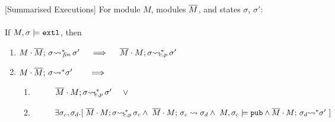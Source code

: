 \begin{auxLemma}
\label{lemma:external_breakdown:term}[Summarised Executions]
For   module $M$, modules $\overline{M}$, and states $\sigma$, $\sigma'$:
\\
\\
If $M,\sigma \models \mbox{\normalfont{\texttt{extl}}}$, then
\begin{enumerate}
\item
\label{lemma:external_breakdown:term:one}
$\leadstoBoundedStarFin {M\cdot \Mtwo}  {\sigma}  {\sigma'}  \ \ \  \ 
\Longrightarrow \ \ \  \ \leadstoBoundedExtPub {\Mtwo\cdot M}    {\sigma}  {\sigma'}$
\item
\label{lemma:external_breakdown:two}
$M\cdot \overline{M};\, {\sigma} {\rightsquigarrow^*} \sigma'  \ \ \  \ \ \  
\Longrightarrow$ 

\begin{enumerate}
\item
$\strut \ \ \ \ \ \ \ \    \leadstoBoundedExtPub {\Mtwo\cdot M}    {\sigma}  {\sigma'}\ \ \ \  \vee$
\item
$\strut \ \ \ \ \ \ \ \    \exists \sigma_c,\sigma_d.[\ 
\leadstoBoundedExtPub {\Mtwo\cdot M}    {\sigma}  {\sigma_c} 
\wedge\ \leadstoBounded  {\Mtwo\cdot M}    {\sigma_c}  {\sigma_d} 
\wedge \ M, \sigma_c \models \pubMeth \wedge \leadstoBoundedStar  {\Mtwo\cdot M}    {\sigma_d}  {\sigma'} \ ]
$
\end{enumerate}
\end{enumerate}
\end{auxLemma}
 



